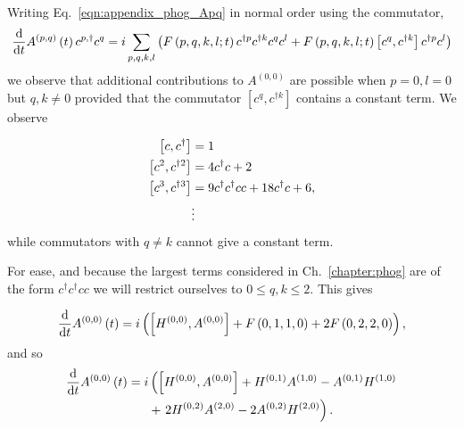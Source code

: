 Writing Eq.~\ref{eqn:appendix_phog_Apq} in normal order using the commutator,
\begin{equation}
\frac{\mathrm{d}}{\mathrm{d}t} A^{\left(p, q\right)}\left(t\right) c^{p, \dagger} c^q = i \sum_{p, q, k, l}\left( F\left( p, q, k, l;t\right) c^{\dagger p} c^{\dagger k} c^q c^l + F\left(p, q, k, l;t\right)  \left[ c^{q}, c^{\dagger k}\right] c^{\dagger p} c^l \right)
\end{equation}
we observe that additional contributions to $A^{\left(0, 0\right)}$ are possible when $p=0, l=0$ but $q, k \ne 0$ provided that the commutator $\left[ c^q, c^{\dagger k}\right]$ contains a constant term. We observe

\begin{align}\label{eqn:phog_appendix_commutator}
\left[ c, c^\dagger \right] &= 1 \notag \\
%
\left[ c^2, c^{\dagger 2} \right] &= 4 c^\dagger c + 2 \notag \\
%
\left[ c^3, c^{\dagger 3} \right] &= 9 c^\dagger c^\dagger c c + 18 c^\dagger c + 6 ,\notag \\
%
&\vdots
\end{align}
while commutators with $q \ne k$ cannot give a constant term. 

For ease, and because the largest terms considered in Ch.~\ref{chapter:phog} are of the form $c^\dagger c^\dagger c c$ we will restrict ourselves to $0 \le q, k \le 2$. This gives

\begin{equation}
\frac{\mathrm{d}}{\mathrm{d}t} A^{\left(0, 0\right)}\left(t\right) = i \left( \left[ H^{\left(0, 0\right)}, A^{\left(0, 0\right)}\right] + F\left(0, 1, 1, 0\right) + 2 F\left(0, 2, 2, 0\right)\right), \notag
\end{equation}
and so 
\begin{align}\label{eqn:ddt_a00}
\ddt A^{\left(0, 0\right)}\left(t\right) = i  &\left(\left[ H^{\left(0, 0\right)}, A^{\left(0, 0\right)}\right] + H^{\left(0, 1\right)} A^{\left(1, 0\right)} - A^{\left(0, 1\right)} H^{\left(1, 0\right)} \right. \notag \\
%
&+\left. 2 H^{\left(0, 2\right)} A^{\left(2, 0\right)} - 2 A^{\left(0, 2\right)} H^{\left(2, 0\right)} \right).
\end{align}


